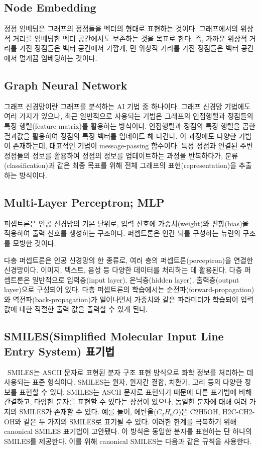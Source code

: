 \documentclass[9pt]{ieeeconf}
\begin{document}
\subsection[short]{\large {Node Embedding}}
\indent 정점 임베딩은 그래프의 정점들을 벡터의 형태로 표현하는 것이다. 그래프에서의 위상적 거리를 임베딩한 벡터 공간에서도 보존하는 것을 목표로 한다. 
즉, 가까운 위상적 거리를 가진 정점들은 벡터 공간에서 가깝게, 먼 위상적 거리를 가진 정점들은 벡터 공간에서 멀게끔 임베딩하는 것이다.

\subsection[short]{\large {Graph Neural Network}}
그래프 신경망이란 그래프를 분석하는 AI 기법 중 하나이다. 그래프 신경망 기법에도 여러 가지가 있으나, 
최근 일반적으로 사용되는 기법은 그래프의 인접행렬과 정점들의 특징 행렬(feature matrix)를 활용하는 방식이다. 
인접행렬과 정점의 특징 행렬을 곱한 결과값을 활용하여 정점의 특징 벡터를 업데이트 해 나간다. 
이 과정에도 다양한 기법이 존재하는데, 대표적인 기법이 message-passing 함수이다. 
특정 정점과 연결된 주변 정점들의 정보를 활용하여 정점의 정보를 업데이트하는 과정을 반복하다가, 
분류(classification)과 같은 최종 목표를 위해 전체 그래프의 표현(representation)을 추출하는 방식이다.

\subsection[short]{\large {Multi-Layer Perceptron; MLP}}
\indent 퍼셉트론은 인공 신경망의 기본 단위로, 입력 신호에 가중치(weight)와 편향(bias)을 적용하여 출력 신호를 생성하는 구조이다. 
퍼셉트론은 인간 뇌를 구성하는 뉴런의 구조를 모방한 것이다.

\indent 다층 퍼셉트론은 인공 신경망의 한 종류로, 여러 층의 퍼셉트론(perceptron)을 연결한 신경망이다. 이미지, 텍스트, 음성 등 다양한 데이터를 처리하는 데 활용된다. 
다층 퍼셉트론은 일반적으로 입력층(input layer), 은닉층(hidden layer), 출력층(output layer)으로 구성되어 있다. 
다층 퍼셉트론의 학습에서는 순전파(forward-propagation)와 역전파(back-propagation)가 일어나면서 가중치와 같은 파라미터가 학습되어 입력 값에 대한 적절한 출력 값을 출력할 수 있게 된다.

\subsection[short]{\large {SMILES(Simplified Molecular Input Line Entry System) 표기법}}\
\indent SMILES는 ASCII 문자로 표현된 분자 구조 표현 방식으로 화학 정보를 처리하는 데 사용되는 표준 형식이다. SMILES는 원자, 원자간 결합, 치환기, 고리 등의 다양한 정보를 표현할 수 있다. 
SMILES는 ASCII 문자로 표현되기 때문에 다른 표기법에 비해 간결하고, 다양한 분자를 표현할 수 있다는 장점이 있으나, 동일한 분자에 대해 여러 가지의 SMILES가 존재할 수 있다. 
예를 들어, 에탄올($C_2 H_6 O$)은 C2H5OH, H2C-CH2-OH와 같은 두 가지의 SMILES로 표기될 수 있다. 이러한 한계를 극복하기 위해 canonical SMILES 표기법이 고안됐다.
이 방식은 동일한 분자를 표현하는 단 하나의 SMILES를 제공한다. 이를 위해 canonical SMILES는 다음과 같은 규칙을 사용한다.
\end{document}

